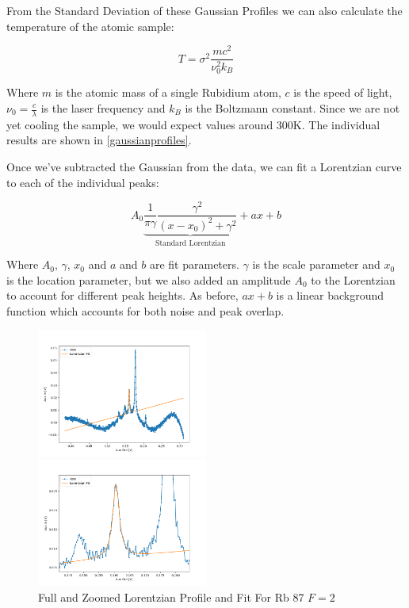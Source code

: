 \documentclass[12pt, a4paper]{article}
\begin{document}
From the Standard Deviation of these Gaussian Profiles we can also calculate the temperature of the atomic sample:

\begin{equation}
T = \sigma^2 \frac{mc^2}{\nu_0^2 k_B}
\label{temperature}
\end{equation}

Where $m$ is the atomic mass of a single Rubidium atom, $c$ is the speed of light, $\nu_0 = \frac{c}{\lambda}$ is the laser frequency and $k_B$ is the Boltzmann constant. Since we are not yet cooling the sample, we would expect values around $300\si{\kelvin}$. The individual results are shown in \autoref{gaussianprofiles}.

Once we've subtracted the Gaussian from the data, we can fit a Lorentzian curve to each of the individual peaks:

\begin{equation}
A_0 \underbrace{\frac{1}{\pi\gamma}\frac{\gamma^2}{(x-x_0)^2 + \gamma^2}}_\text{Standard Lorentzian} + ax + b
\end{equation}

Where $A_0$, $\gamma$, $x_0$ and $a$ and $b$ are fit parameters. $\gamma$ is the scale parameter and $x_0$ is the location parameter, but we also added an amplitude $A_0$ to the Lorentzian to account for different peak heights. As before, $ax + b$ is a linear background function which accounts for both noise and peak overlap.

\begin{figure}
    \centering
    \parbox{0.45\textwidth}{
        \includegraphics[width=0.5\textwidth]{lorentzianfull.png}
    }
    \hfill
    \parbox{0.45\textwidth}{
        \includegraphics[width=0.5\textwidth]{examplelorentzian.png}
    }
    \caption{Full and Zoomed Lorentzian Profile and Fit For Rb 87 $F = 2$}
    \label{lorentzianprofile}
\end{figure}
\end{document}
